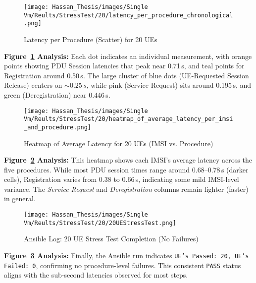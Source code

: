 \vspace{0.75em}
\begin{figure}[H]
    \centering
    \texttt{[image: Hassan\_Thesis/images/Single Vm/Reults/StressTest/20/latency\_per\_procedure\_chronological.png]}
    \caption{Latency per Procedure (Scatter) for 20 UEs}
    \label{fig:20ue-scatter-latency}
\end{figure}

\noindent
\textbf{Figure~\ref{fig:20ue-scatter-latency} Analysis:}  
Each dot indicates an individual measurement, with orange points showing PDU Session latencies that peak near 0.71\,s, and teal points for Registration around 0.50\,s. The large cluster of blue dots (UE-Requested Session Release) centers on $\sim0.25\,s$, while pink (Service Request) sits around 0.195\,s, and green (Deregistration) near 0.446\,s.

\vspace{0.75em}
\begin{figure}[H]
    \centering
    \texttt{[image: Hassan\_Thesis/images/Single Vm/Reults/StressTest/20/heatmap\_of\_average\_latency\_per\_imsi\_and\_procedure.png]}
    \caption{Heatmap of Average Latency for 20 UEs (IMSI vs. Procedure)}
    \label{fig:20ue-heatmap-latency}
\end{figure}

\noindent
\textbf{Figure~\ref{fig:20ue-heatmap-latency} Analysis:}  
This heatmap shows each IMSI’s average latency across the five procedures. While most PDU session times range around 0.68--0.78\,s (darker cells), Registration varies from 0.38 to 0.66\,s, indicating some mild IMSI-level variance. The \textit{Service Request} and \textit{Deregistration} columns remain lighter (faster) in general.

\vspace{0.75em}
\begin{figure}[H]
    \centering
    \texttt{[image: Hassan\_Thesis/images/Single Vm/Reults/StressTest/20/20UEStressTest.png]}
    \caption{Ansible Log: 20 UE Stress Test Completion (No Failures)}
    \label{fig:20ue-ansible-output}
\end{figure}

\noindent
\textbf{Figure~\ref{fig:20ue-ansible-output} Analysis:}  
Finally, the Ansible run indicates \texttt{UE's Passed: 20, UE's Failed: 0}, confirming no procedure-level failures. This consistent \texttt{PASS} status aligns with the sub-second latencies observed for most steps.

